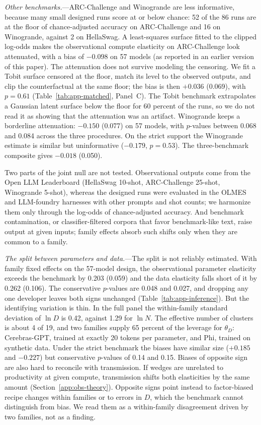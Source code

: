 \emph{Other benchmarks.}---ARC-Challenge and Winogrande are less informative, because many small designed runs score
at or below chance: 52 of the 86 runs are at the floor of chance-adjusted accuracy on ARC-Challenge and 16 on
Winogrande, against 2 on HellaSwag. A least-squares surface fitted to the clipped log-odds makes the observational
compute elasticity on ARC-Challenge look attenuated, with a bias of $-0.098$ on 57 models (as reported in an earlier
version of this paper). The attenuation does not survive
modeling the censoring. We fit a Tobit surface censored at the floor, match its level to the observed outputs, and clip
the counterfactual at the same floor; the bias is then $+0.036$ (0.069), with $p=0.61$ (Table~\ref{tab:app-matched},
Panel~C). The Tobit benchmark extrapolates a Gaussian latent surface below the floor for 60 percent of the runs, so we
do not read it as showing that the attenuation was an artifact. Winogrande keeps a borderline attenuation: $-0.150$
(0.077) on 57 models, with $p$-values between 0.068 and 0.084 across the three procedures. On the strict support the
Winogrande estimate is similar but uninformative ($-0.179$, $p=0.53$). The three-benchmark composite gives $-0.018$
(0.050).

Two parts of the joint null are not tested. Observational outputs come from the Open LLM Leaderboard (HellaSwag 10-shot,
ARC-Challenge 25-shot, Winogrande 5-shot), whereas the designed runs were evaluated in the OLMES and LLM-foundry
harnesses with other prompts and shot counts; we harmonize them only through the log-odds of chance-adjusted accuracy.
And benchmark contamination, or classifier-filtered corpora that favor benchmark-like text, raise output at given
inputs; family effects absorb such shifts only when they are common to a family.

\emph{The split between parameters and data.}---The split is not reliably estimated. With family fixed effects on the
57-model design, the observational parameter elasticity exceeds the benchmark by 0.203 (0.059) and the data elasticity
falls short of it by 0.262 (0.106). The conservative $p$-values are 0.048 and 0.027, and dropping any one developer
leaves both signs unchanged (Table~\ref{tab:app-inference}). But the identifying variation is thin. In the full panel
the within-family standard deviation of $\ln D$ is 0.42, against 1.29 for $\ln N$. The effective number of clusters is
about 4 of 19, and two families supply 65 percent of the leverage for $\theta_D$: Cerebras-GPT, trained at exactly 20
tokens per parameter, and Phi, trained on synthetic data. Under the strict benchmark the biases have similar size
($+0.185$ and $-0.227$) but conservative $p$-values of 0.14 and 0.15. Biases of opposite sign are also hard to
reconcile with transmission. If wedges are unrelated to productivity at given compute, transmission shifts both
elasticities by the same amount (Section~\ref{app:obs-theory}). Opposite signs point instead to factor-biased recipe
changes within families or to errors in $D$, which the benchmark cannot distinguish from bias. We read them as a
within-family disagreement driven by two families, not as a finding.

